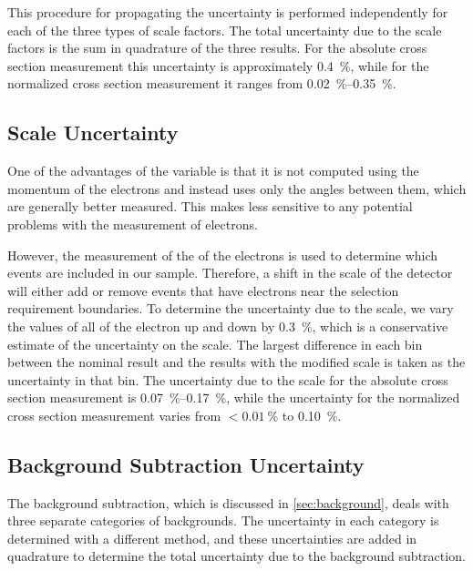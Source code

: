 This procedure for propagating the uncertainty is performed independently for
each of the three types of scale factors. The total uncertainty due to the
scale factors is the sum in quadrature of the three results. For the absolute
cross section measurement this uncertainty is approximately \SI{0.4}{\percent},
while for the normalized cross section measurement it ranges from
\SIrange{0.02}{0.35}{\percent}.

\subsection{\texorpdfstring{\pt}{PT} Scale Uncertainty}
\label{ssec:pt_scale_uncertainty}

One of the advantages of the \phistar variable is that it is not computed using
the momentum of the electrons and instead uses only the angles between them,
which are generally better measured. This makes \phistar less sensitive to any
potential problems with the \pt measurement of electrons.

However, the measurement of the \pt of the electrons is used to determine which
events are included in our sample. Therefore, a shift in the \pt scale of the
detector will either add or remove events that have electrons near the \pt
selection requirement boundaries. To determine the uncertainty due to the \pt
scale, we vary the \pt values of all of the electron up and down by
\SI{0.3}{\percent}, which is a conservative estimate of the uncertainty on the
\pt scale. The largest difference in each \phistar bin between the nominal
result and the results with the modified \pt scale is taken as the uncertainty
in that bin. The uncertainty due to the \pt scale for the absolute cross
section measurement is \SIrange{0.07}{0.17}{\percent}, while the uncertainty
for the normalized cross section measurement varies from $<
\SI{0.01}{\percent}$ to \SI{0.10}{\percent}.

\subsection{Background Subtraction Uncertainty}
\label{ssec:background_subtraction_uncertainty}

The background subtraction, which is discussed in \cref{sec:background},
deals with three separate categories of backgrounds. The uncertainty in
each category is determined with a different method, and these uncertainties
are added in quadrature to determine the total uncertainty due to the
background subtraction.

